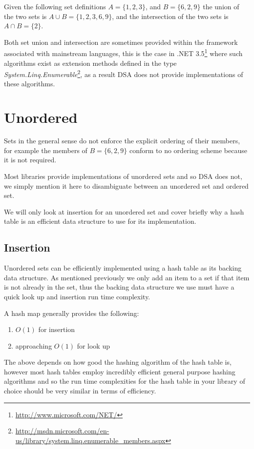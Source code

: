 Given the following set definitions $A = \{1, 2, 3\}$, and $B = \{6, 2, 9\}$ the union of the two sets is $A \cup B= \{1, 2, 3, 6, 9\}$, and the intersection of the two sets is $A \cap B= \{2\}$.

Both set union and intersection are sometimes provided within the framework associated with mainstream languages, this is the case in .NET 3.5\footnote{\url{http://www.microsoft.com/NET/}} where such algorithms exist as extension methods defined in the type \textit{System.Linq.Enumerable}\footnote{\url{http://msdn.microsoft.com/en-us/library/system.linq.enumerable_members.aspx}}, as a result DSA does not provide implementations of these algorithms.

\section{Unordered}
Sets in the general sense do not enforce the explicit ordering of their members, for example the members of $B = \{6, 2, 9\}$ conform to no ordering scheme because it is not required. 

Most libraries provide implementations of unordered sets and so DSA does not, we simply mention it here to disambiguate between an unordered set and ordered set. 

We will only look at insertion for an unordered set and cover briefly why a hash table is an efficient data structure to use for its implementation.

\subsection{Insertion}
Unordered sets can be efficiently implemented using a hash table as its backing data structure. As mentioned previously we only add an item to a set if that item is not already in the set, thus the backing data structure we use must have a quick look up and insertion run time complexity.

A hash map generally provides the following:

\begin{enumerate}
\item $O(1)$ for insertion
\item approaching $O(1)$ for look up
\end{enumerate}

The above depends on how good the hashing algorithm of the hash table is, however most hash tables employ incredibly efficient general purpose hashing algorithms and so the run time complexities for the hash table in your library of choice should be very similar in terms of efficiency.

